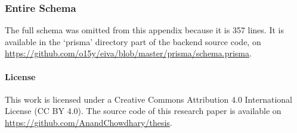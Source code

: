 \documentclass{article}
\begin{document}
\subsubsection*{Entire Schema}

The full schema was omitted from this appendix because it is 357 lines. It is available in the `prisma' directory part of the backend source code, on \url{https://github.com/o15y/eiva/blob/master/prisma/schema.prisma}.

\newpage



\paragraph{License} This work is licensed under a Creative Commons Attribution 4.0 International License (CC BY 4.0). The source code of this research paper is available on \url{https://github.com/AnandChowdhary/thesis}.
\end{document}
